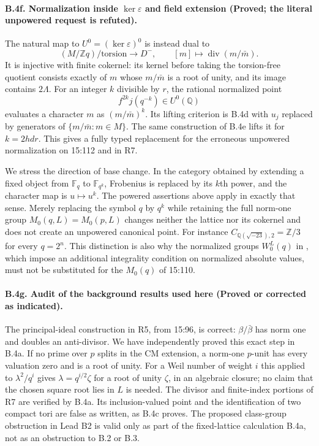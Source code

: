 \paragraph{B.4f. Normalization inside $\ker\varepsilon$ and field extension
(Proved; the literal unpowered request is refuted).}
\label{B4f}
The natural map to $U^0=(\ker\varepsilon)^0$ is instead dual to
\[
 (M/\mathbb Zq)/\mathrm{torsion}\longrightarrow D^-,
 \qquad[m]\longmapsto\operatorname{div}(m/\bar m).
\]
It is injective with finite cokernel: its kernel before taking the
torsion-free quotient consists exactly of $m$ whose $m/\bar m$ is a
root of unity, and its image contains $2\Lambda$. For an integer
$k$ divisible by $r$, the rational normalized point
\[
 f^{2k}j(q^{-k})\in U^0(\mathbb Q)
\]
evaluates a character $m$ as $(m/\bar m)^k$. Its lifting criterion
is B.4d with $u_j$ replaced by generators of
$\{m/\bar m:m\in M\}$. The same construction of B.4e lifts it for
$k=2hdr$. This gives a fully typed replacement for the erroneous
unpowered normalization on 15:112 and in R7.

We stress the direction of base change. In the category obtained by
extending a fixed object from $\mathbb F_q$ to $\mathbb F_{q^k}$,
Frobenius is replaced by its $k$th power, and the character map is
$u\mapsto u^k$. The powered assertions above apply in exactly that
sense. Merely replacing the symbol $q$ by $q^k$ while retaining the
full norm-one group $M_0(q,L)=M_0(p,L)$ changes neither the lattice
nor its cokernel and does not create an unpowered canonical point.
For instance $C_{\mathbb Q(\sqrt{-23}),2}=\mathbb Z/3$ for every
$q=2^n$. This distinction is also why the normalized groups
$W_0^L(q)$ in \citet[Proposition~2.27]{Milne1994}, which impose an
additional integrality condition on normalized absolute values,
must not be substituted for the $M_0(q)$ of 15:110.

\paragraph{B.4g. Audit of the background results used here (Proved or
corrected as indicated).}
\label{B4g}
The principal-ideal construction in R5, from 15:96, is correct:
$\beta/\bar\beta$ has norm one and doubles an anti-divisor. We have
independently proved this exact step in B.4a. If no prime over $p$
splits in the CM extension, a norm-one $p$-unit has every valuation
zero and is a root of unity. For a Weil number of weight $i$ this
applied to $\lambda^2/q^i$ gives
$\lambda=q^{i/2}\zeta$ for a root of unity $\zeta$, in an algebraic
closure; no claim that the chosen square root lies in $L$ is needed.
The divisor and finite-index portions of R7 are verified by B.4a.
Its inclusion-valued point and the identification of two compact
tori are false as written, as B.4c proves. The proposed class-group
obstruction in Lead B2 is valid only as part of the fixed-lattice
calculation B.4a, not as an obstruction to B.2 or B.3.
